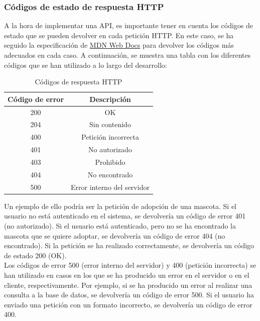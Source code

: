 \subsubsection{Códigos de estado de respuesta HTTP}\label{subsubsec:codigos-de-error}

A la hora de implementar una API, es importante tener en cuenta los códigos de estado que se pueden devolver en cada petición HTTP. En este caso, se ha
seguido la especificación de \href{https://developer.mozilla.org/es/docs/Web/HTTP/Status}{MDN Web Docs} para devolver los códigos más
adecuados en cada caso. A continuación, se muestra una tabla con los diferentes códigos que se han utilizado a lo largo del desarrollo:

\begin{table}[H]
    \centering
    \begin{tabular}{|c|c|}
        \hline
        \textbf{Código de error} & \textbf{Descripción} \\
        \hline
        200 & OK \\
        \hline
        204 & Sin contenido \\
        \hline
        400 & Petición incorrecta \\
        \hline
        401 & No autorizado \\
        \hline
        403 & Prohibido \\
        \hline
        404 & No encontrado \\
        \hline
        500 & Error interno del servidor \\
        \hline
    \end{tabular}
    \caption{Códigos de respuesta HTTP}
    \label{tab:codigos-respuesta-http}
\end{table}

Un ejemplo de ello podría ser la petición de adopción de una mascota. Si el usuario no está autenticado en el sistema, se devolvería un código de error
401 (no autorizado). Si el usuario está autenticado, pero no se ha encontrado la mascota que se quiere adoptar, se devolvería un código de error 404 (no encontrado).
Si la petición se ha realizado correctamente, se devolvería un código de estado 200 (OK). \\

Los códigos de error 500 (error interno del servidor) y 400 (petición incorrecta) se han utilizado en casos en los que se ha producido un error en el servidor
o en el cliente, respectivamente. Por ejemplo, si se ha producido un error al realizar una consulta a la base de datos, se devolvería un código de error 500.
Si el usuario ha enviado una petición con un formato incorrecto, se devolvería un código de error 400.

